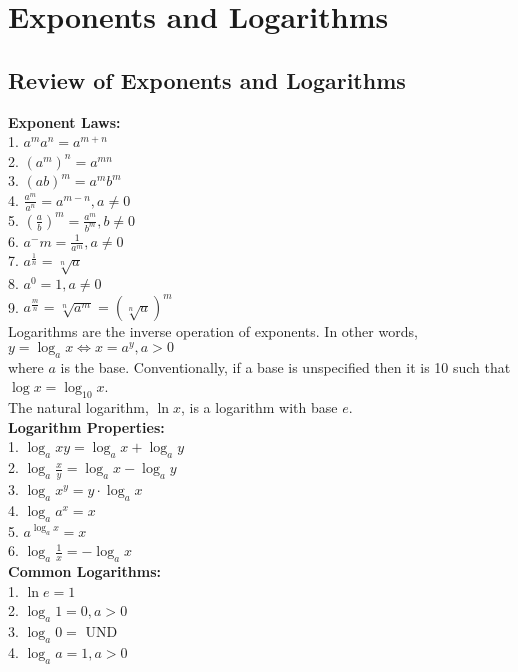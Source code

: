 \section{Exponents and Logarithms}

    \subsection{Review of Exponents and Logarithms}
        \color{purple} \textbf{Exponent Laws:} \color{black} \\
        1. $a^ma^n=a^{m+n}$ \\
        2. $(a^m)^n=a^{mn}$ \\
        3. $(ab)^m=a^mb^m$ \\
        4. $\frac{a^m}{a^n}=a^{m-n},a\not=0$ \\
        5. $(\frac{a}{b})^m=\frac{a^m}{b^m},b\not=0$ \\
        6. $a^-m=\frac{1}{a^m},a\not=0$ \\
        7. $a^{\frac{1}{n}}=\sqrt[n]{a}$ \\
        8. $a^0=1,a\not=0$ \\
        9. $a^{\frac{m}{n}}=\sqrt[n]{a^m}=(\sqrt[n]{a})^m$ \\

        \noindent Logarithms are the inverse operation of exponents. In other words, \\
        $y=\log_ax\iff x=a^y, a>0$ \\
        where $a$ is the base. Conventionally, if a base is unspecified then it is 10 such that
        $\log x = \log _{10} x$. \\

        \noindent The natural logarithm, $\ln{x}$, is a logarithm with base $e$. \\

        \noindent \color{purple} \textbf{Logarithm Properties:} \color{black} \\
        1. $\log _a xy=\log _a x+\log _a y$ \\
        2. $\log _a \frac{x}{y}=\log _a x - \log _a y$ \\
        3. $\log _a x^y=y\cdot\log _a x$ \\
        4. $\log _a a^x=x$ \\
        5. $a^{\log _a x} = x$ \\
        6. $\log _a \frac{1}{x}=-\log _a {x}$ \\

        \noindent \color{purple} \textbf{Common Logarithms:} \color{black} \\
        1. $\ln{e}=1$ \\
        2. $\log _a {1}=0, a>0$ \\
        3. $\log _a {0} = $ UND \\
        4. $\log _a {a} = 1, a>0$



